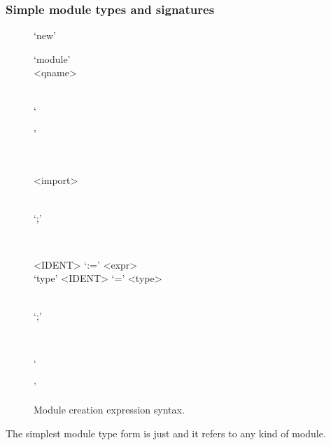 \documentclass[droidmono,libertine,twoside,user,unofficial]{ecarticle}
\newcommand{\optSemiCol}{\begin{stack}\\`;'\end{stack}}
\begin{document}
\subsubsection*{Simple module types and signatures}

\begin{figure}[tb]
\begin{syntdiag}
    `new'
    \begin{stack}
      `module'
      \\
      <qname>
    \end{stack}
    \begin{stack}
      \\
      `{'
        \begin{stack}
          \\
          \begin{rep}
            <import> \optSemiCol
            \\
          \end{rep}
        \end{stack}
        \begin{rep}
        \begin{stack}
          <IDENT> `:=' <expr>
          \\
          `type' <IDENT> `=' <type>
        \end{stack}
        \optSemiCol
        \\
      \end{rep}
      `}'
    \end{stack}
  \end{syntdiag}
    \caption{Module creation expression syntax.}
  \label{fig:new-expr-grammar}
\end{figure}

The simplest module type form is %
just 
and it refers to any kind of module.
\end{document}
